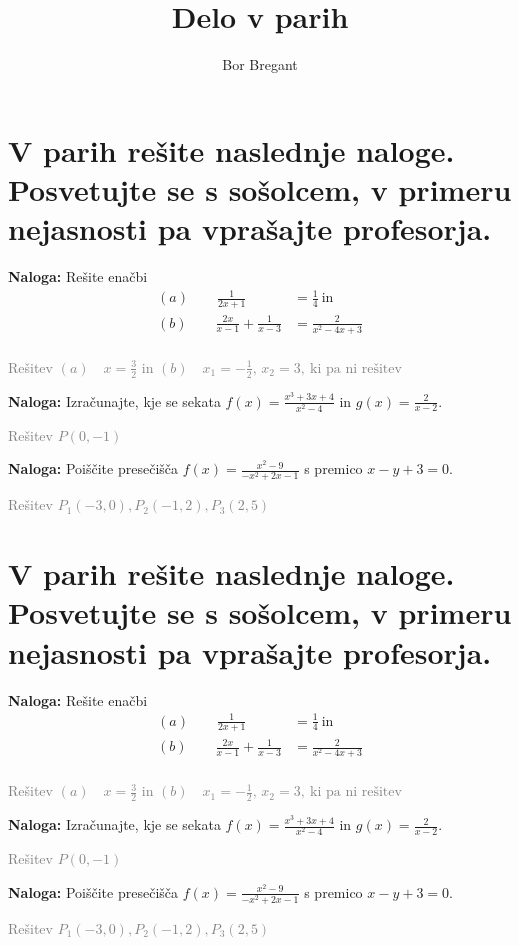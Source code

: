 \documentclass{article}
\title{Delo v parih}
\author{Bor Bregant}
\date{\vspace{-5ex}}
\newcounter{example}[section]
\newenvironment{example}[1][]{\par\medskip
   \noindent \textbf{Naloga:} \rmfamily}{\medskip}
\begin{document}
\section*{V parih rešite naslednje naloge. Posvetujte se s sošolcem, v primeru nejasnosti pa vprašajte profesorja.}


\begin{example}
    Rešite enačbi
    \begin{align*}
        (a)\qquad\frac{1}{2x+1}&=\frac{1}{4} \ \text{in}\\
        (b)\qquad\frac{2x}{x-1}+\frac{1}{x-3}&=\frac{2}{x^2-4x+3}\\
    \end{align*}
\end{example}

\textcolor{gray}{Rešitev $(a)\quad x=\frac{3}{2}$ in $(b)\quad x_1 = -\frac{1}{2},\, x_2=3,\ \text{ki pa ni rešitev}$}

\begin{example}
    Izračunajte, kje se sekata $f(x)=\frac{x^3+3x+4}{x^2-4}$ in $g(x)=\frac{2}{x-2}$.
\end{example}

\textcolor{gray}{Rešitev $P(0,-1)$}

\begin{example}
    Poiščite presečišča $f(x)=\frac{x^2-9}{-x^2+2x-1}$ s premico $x-y+3=0$.
\end{example}

\textcolor{gray}{Rešitev $P_1 (-3,0), P_2(-1,2), P_3(2,5)$}

\section*{V parih rešite naslednje naloge. Posvetujte se s sošolcem, v primeru nejasnosti pa vprašajte profesorja.}

\begin{example}
    Rešite enačbi
    \begin{align*}
        (a)\qquad\frac{1}{2x+1}&=\frac{1}{4} \ \text{in}\\
        (b)\qquad\frac{2x}{x-1}+\frac{1}{x-3}&=\frac{2}{x^2-4x+3}\\
    \end{align*}
\end{example}

\textcolor{gray}{Rešitev $(a)\quad x=\frac{3}{2}$ in $(b)\quad x_1 = -\frac{1}{2},\, x_2=3,\ \text{ki pa ni rešitev}$}

\begin{example}
    Izračunajte, kje se sekata $f(x)=\frac{x^3+3x+4}{x^2-4}$ in $g(x)=\frac{2}{x-2}$.
\end{example}

\textcolor{gray}{Rešitev $P(0,-1)$}

\begin{example}
    Poiščite presečišča $f(x)=\frac{x^2-9}{-x^2+2x-1}$ s premico $x-y+3=0$.
\end{example}

\textcolor{gray}{Rešitev $P_1 (-3,0), P_2(-1,2), P_3(2,5)$}
\end{document}
